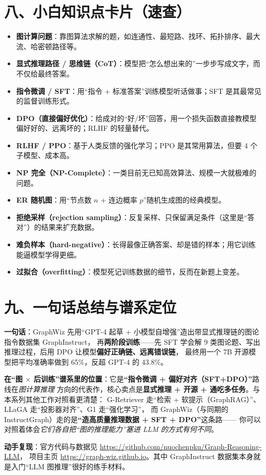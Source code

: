 \documentclass[11pt,UTF8,fontset=fandol]{ctexart}
\begin{document}
\section{八、小白知识点卡片（速查）}
\begin{itemize}[leftmargin=2em]
  \item \textbf{图计算问题}：靠图算法求解的题，如连通性、最短路、找环、拓扑排序、最大流、哈密顿路径等。
  \item \textbf{显式推理路径 / 思维链（CoT）}：模型把“怎么想出来的”一步步写成文字，而不仅给最终答案。
  \item \textbf{指令微调 / SFT}：用“指令 + 标准答案”训练模型听话做事；SFT 是其最常见的监督训练形式。
  \item \textbf{DPO（直接偏好优化）}：给成对的“好/坏”回答，用一个损失函数直接教模型偏好好的、远离坏的；RLHF 的轻量替代。
  \item \textbf{RLHF / PPO}：基于人类反馈的强化学习；PPO 是其常用算法，但要 4 个子模型、成本高。
  \item \textbf{NP 完全（NP-Complete）}：一类目前无已知高效算法、规模一大就极难的问题。
  \item \textbf{ER 随机图}：用“节点数 $n$ + 连边概率 $p$”随机生成图的经典模型。
  \item \textbf{拒绝采样（rejection sampling）}：反复采样、只保留满足条件（这里是“答对”）的结果来扩充数据。
  \item \textbf{难负样本（hard-negative）}：长得最像正确答案、却是错的样本；用它训练能逼模型学得更细。
  \item \textbf{过拟合（overfitting）}：模型死记训练数据的细节，反而在新题上变差。
\end{itemize}

\section{九、一句话总结与谱系定位}

\textbf{一句话}：GraphWiz 先用“GPT-4 起草 + 小模型自增强”造出带显式推理链的图论指令数据集 GraphInstruct，
再\textbf{两阶段训练}——先 SFT 学会解 9 类图论题、写出推理过程，后用 DPO 让模型\textbf{偏好正确链、远离错误链}，
最终用一个 7B 开源模型把平均准确率做到 65\%，反超 GPT-4 的 43.8\%。

\textbf{在“图 $\times$ 后训练”谱系里的位置}：它是\textbf{“指令微调 + 偏好对齐（SFT+DPO）”}路线在\emph{图计算推理}
方向的代表作，核心卖点是\textbf{显式推理 + 开源 + 通吃多任务}。与本系列其他工作对照看更清楚：
G-Retriever 走“检索 + 软提示（GraphRAG）”、LLaGA 走“投影器对齐”、G1 走“强化学习”，
而 GraphWiz（与同期的 InstructGraph）走的是\textbf{“造高质量推理数据 + SFT + DPO”}这条路——
你可以对照着体会\emph{它们各自把“图的推理能力”塞进 LLM 的方式有何不同}。

\textbf{动手复现}：官方代码与数据见 \url{https://github.com/nuochenpku/Graph-Reasoning-LLM}，
项目主页 \url{https://graph-wiz.github.io}。其中 GraphInstruct 数据集本身就是入门“LLM 图推理”很好的练手材料。
\end{document}
